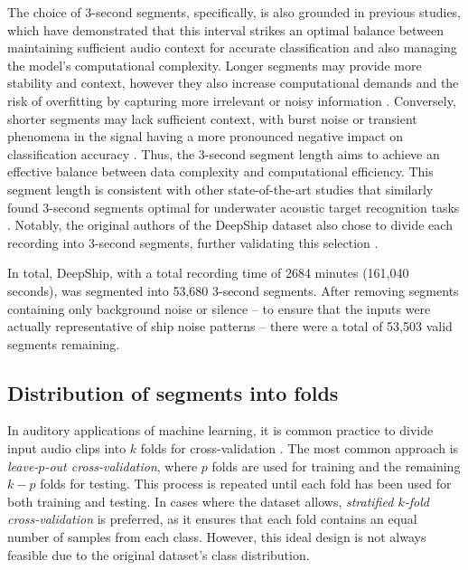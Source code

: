 The choice of 3-second segments, specifically, is also grounded in previous studies, which have demonstrated that this interval strikes an optimal balance between maintaining sufficient audio context for accurate classification and also managing the model's computational complexity. Longer segments may provide more stability and context, however they also increase computational demands and the risk of overfitting by capturing more irrelevant or noisy information \cite{chen_ship-radiated_2024, li_underwater_2022}. Conversely, shorter segments may lack sufficient context, with burst noise or transient phenomena in the signal having a more pronounced negative impact on classification accuracy \cite{shen_auditory_2018, tang_deep_2024}. Thus, the 3-second segment length aims to achieve an effective balance between data complexity and computational efficiency. This segment length is consistent with other state-of-the-art studies that similarly found 3-second segments optimal for underwater acoustic target recognition tasks \cite{xu_self-supervised_2024, tang_deep_2024}. Notably, the original authors of the DeepShip dataset also chose to divide each recording into 3-second segments, further validating this selection \cite{irfan_deepship_2021}.

In total, DeepShip, with a total recording time of 2684 minutes (161,040 seconds), was segmented into 53,680 3-second segments. After removing segments containing only background noise or silence -- to ensure that the inputs were actually representative of ship noise patterns -- there were a total of 53,503 valid segments remaining.

\subsection{Distribution of segments into folds}

In auditory applications of machine learning, it is common practice to divide input audio clips into $k$ folds for cross-validation \cite{chi_classifying_2022, basili_classification_2004, zeng_spectrogram_2019, chen_ship-radiated_2024, chen_hierarchical_2024}. The most common approach is \textit{leave-$p$-out cross-validation}, where $p$ folds are used for training and the remaining $k-p$ folds for testing. This process is repeated until each fold has been used for both training and testing. In cases where the dataset allows, \textit{stratified $k$-fold cross-validation} is preferred, as it ensures that each fold contains an equal number of samples from each class. However, this ideal design is not always feasible due to the original dataset's class distribution.

